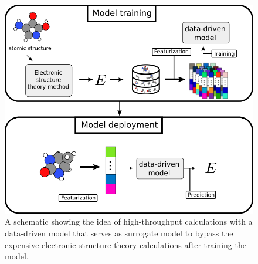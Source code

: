  

\begin{figure}
    \includegraphics[width=\textwidth]{fig/highthroughput-scheme.pdf}
    \caption{A schematic showing the idea of high-throughput calculations with a data-driven model that serves as surrogate model to bypass the expensive electronic structure theory calculations after training the model.}
    \label{fig:high-throughput-scheme}
\end{figure}




